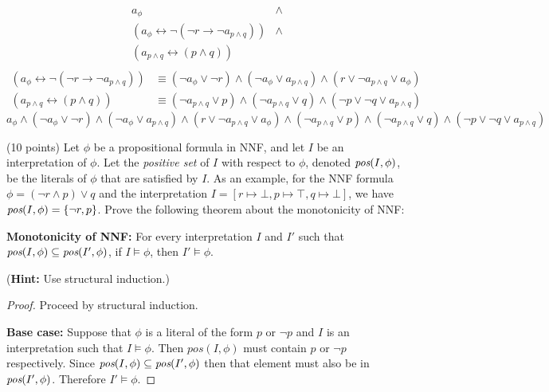 \documentclass{article}
\newenvironment{solution}{\color{blue} \em }{}
\begin{document}
\begin{enumerate}
\begin{solution}
\[
\begin{array}{ll}
a_{\phi} & \land \\
( a_{\phi} \leftrightarrow \neg (\neg r \rightarrow \neg a_{p \wedge q})) & \land \\
(a_{p\wedge q} \leftrightarrow (p \wedge q)) &  \\
\end{array}
\]
\begin{align*}
    (a_{\phi} \leftrightarrow \neg (\neg r \rightarrow \neg a_{p \wedge q})) &\equiv
(\neg a_\phi \lor \neg r) \land (\neg a_\phi \lor a_{p \land q}) \land (r \lor \neg a_{p \land q} \lor a_\phi) \\
    (a_{p\wedge q} \leftrightarrow (p \wedge q)) &\equiv
    (\neg a_{p\wedge q} \lor p ) \land (\neg a_{p\land q} \lor q) \wedge (\neg p \lor \neg q \lor a_{p\wedge q})
\end{align*}
\[
a_\phi \land
(\neg a_\phi \lor \neg r) \land (\neg a_\phi \lor a_{p \land q}) \land (r \lor \neg a_{p \land q} \lor a_\phi) \land
(\neg a_{p\wedge q} \lor p ) \land (\neg a_{p\land q} \lor q) \wedge (\neg p \lor \neg q \lor a_{p\wedge q})
\]

\end{solution}

\item (10 points)  Let $\phi$ be a propositional formula in NNF, and let $I$ be an interpretation of $\phi$. Let the \emph{positive set} of $I$ with respect to $\phi$, denoted $\emph{pos}(I, \phi)$, be the literals of $\phi$ that are satisfied by $I$. As an example, for the NNF formula $\phi = (\neg r \land p) \lor q$ and the interpretation $I = [r \mapsto \bot, p \mapsto \top, q \mapsto \bot]$, we have $\emph{pos}(I, \phi) = \{ \neg r, p \}$. Prove the following theorem about the monotonicity of NNF:

{\bf Monotonicity of NNF:} For every interpretation $I$ and $I'$ such that $\emph{pos}(I, \phi) \subseteq \emph{pos}(I', \phi)$, if $I \models \phi$, then $I' \models \phi$.

(\textbf{Hint:} Use structural induction.) \label{prob:NNF}

\begin{solution}
\begin{proof}
    Proceed by structural induction.

\item \textbf{Base case:} Suppose that $\phi$ is a literal of the form $p$ or $\neg p$ and $I$ is an interpretation such that $I \models \phi$. Then $pos(I, \phi)$ must contain $p$ or $\neg p$ respectively. Since $\emph{pos}(I, \phi) \subseteq \emph{pos}(I', \phi)$ then that element must also be in $\emph{pos}(I', \phi)$. Therefore $I' \models \phi$.


\end{proof}
\end{solution}
\end{enumerate}
\end{document}
